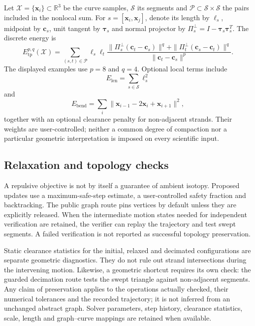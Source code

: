 Let $\mathcal X=\{\mathbf x_i\}\subset\mathbb R^3$ be the curve samples, $\mathcal S$ its segments and $\mathcal P\subset\mathcal S\times\mathcal S$ the pairs included in the nonlocal sum. For $s=[\mathbf x_i,\mathbf x_j]$, denote its length by $\ell_s$, midpoint by $\mathbf c_s$, unit tangent by $\boldsymbol\tau_s$ and normal projector by $\Pi_s^\perp=I-\boldsymbol\tau_s\boldsymbol\tau_s^T$. The discrete energy is
\begin{equation}
E_{\mathrm{tp}}^{p,q}(\mathcal X)=\sum_{(s,t)\in\mathcal P}\ell_s\ell_t\frac{\|\Pi_s^\perp(\mathbf c_t-\mathbf c_s)\|^q+\|\Pi_t^\perp(\mathbf c_s-\mathbf c_t)\|^q}{\|\mathbf c_t-\mathbf c_s\|^p}.
\label{suppeq:tangent_point_energy}
\end{equation}
The displayed examples use $p=8$ and $q=4$. Optional local terms include
\begin{equation}
E_{\mathrm{len}}=\sum_{s\in\mathcal S}\ell_s^2
\end{equation}
and
\begin{equation}
E_{\mathrm{bend}}=\sum_i\|\mathbf x_{i-1}-2\mathbf x_i+\mathbf x_{i+1}\|^2,
\end{equation}
together with an optional clearance penalty for non-adjacent strands. Their weights are user-controlled; neither a common degree of compaction nor a particular geometric interpretation is imposed on every scientific input.

\subsection{Relaxation and topology checks}
\label{supp:repulsive_topology}
A repulsive objective is not by itself a guarantee of ambient isotopy. Proposed updates use a maximum-safe-step estimate, a user-controlled safety fraction and backtracking. The public graph route pins vertices by default unless they are explicitly released. When the intermediate motion states needed for independent verification are retained, the verifier can replay the trajectory and test swept segments. A failed verification is not reported as successful topology preservation.

Static clearance statistics for the initial, relaxed and decimated configurations are separate geometric diagnostics. They do not rule out strand intersections during the intervening motion. Likewise, a geometric shortcut requires its own check: the guarded decimation route tests the swept triangle against non-adjacent segments. Any claim of preservation applies to the operations actually checked, their numerical tolerances and the recorded trajectory; it is not inferred from an unchanged abstract graph. Solver parameters, step history, clearance statistics, scale, length and graph--curve mappings are retained when available.

